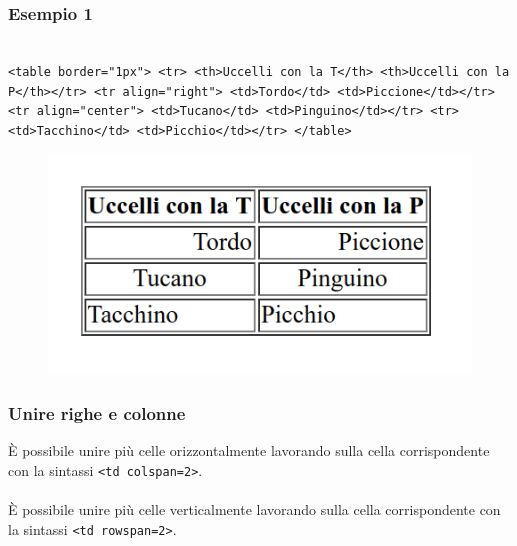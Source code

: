 \documentclass[]{beamer}
\begin{document}
\begin{frame}[fragile]
\frametitle{Esempio 1}

\begin{scriptsize}
\texttt{~\\
<table border="1px">\newline
<tr> <th>Uccelli con la T</th> <th>Uccelli con la P</th></tr>\newline
<tr align="right"> <td>Tordo</td> <td>Piccione</td></tr>\newline
<tr align="center"> <td>Tucano</td> <td>Pinguino</td></tr>\newline
<tr> <td>Tacchino</td> <td>Picchio</td></tr>\newline
</table>
}
\end{scriptsize}

\begin{figure}
\includegraphics[width=.5\columnwidth]{screenshots/tabella1.png}
\end{figure}

\end{frame}






\begin{frame}[fragile]
\frametitle{Unire righe e colonne}
È possibile unire più celle orizzontalmente lavorando sulla cella corrispondente con la sintassi \texttt{<td colspan=2>}.\\~\\\pause
È possibile unire più celle verticalmente lavorando sulla cella corrispondente con la sintassi \texttt{<td rowspan=2>}.
\end{frame}
\end{document}
